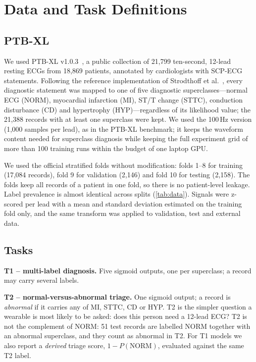 \section{Data and Task Definitions}
\label{sec:data}

\subsection{PTB-XL}
We used PTB-XL v1.0.3~\cite{wagner2020ptbxl}, a public collection of 21,799 ten-second, 12-lead resting ECGs from 18,869 patients, annotated by cardiologists with SCP-ECG statements. Following the reference implementation of Strodthoff et al.~\cite{strodthoff2021benchmark}, every diagnostic statement was mapped to one of five diagnostic superclasses---normal ECG (NORM), myocardial infarction (MI), ST/T change (STTC), conduction disturbance (CD) and hypertrophy (HYP)---regardless of its likelihood value; the 21,388 records with at least one superclass were kept. We used the 100\,Hz version (1,000 samples per lead), as in the PTB-XL benchmark; it keeps the waveform content needed for superclass diagnosis while keeping the full experiment grid of more than 100 training runs within the budget of one laptop GPU.

We used the official stratified folds without modification: folds 1--8 for training (17,084 records), fold 9 for validation (2,146) and fold 10 for testing (2,158). The folds keep all records of a patient in one fold, so there is no patient-level leakage. Label prevalence is almost identical across splits (\cref{tab:data}). Signals were z-scored per lead with a mean and standard deviation estimated on the training fold only, and the same transform was applied to validation, test and external data.

\subsection{Tasks}
\textbf{T1 -- multi-label diagnosis.} Five sigmoid outputs, one per superclass; a record may carry several labels.

\noindent\textbf{T2 -- normal-versus-abnormal triage.} One sigmoid output; a record is \emph{abnormal} if it carries any of MI, STTC, CD or HYP. T2 is the simpler question a wearable is most likely to be asked: does this person need a 12-lead ECG? T2 is not the complement of NORM: 51 test records are labelled NORM together with an abnormal superclass, and they count as abnormal in T2. For T1 models we also report a \emph{derived} triage score, $1-P(\text{NORM})$, evaluated against the same T2 label.

